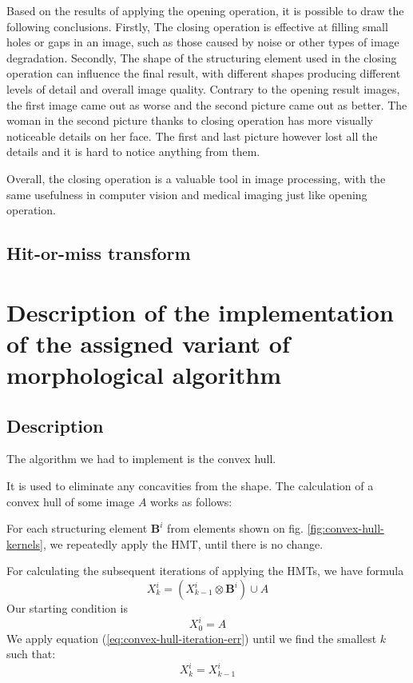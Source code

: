 \documentclass[12pt]{article}
\begin{document}
Based on the results of applying the opening operation, it is possible to draw the following conclusions. Firstly, The closing operation is effective at filling small holes or gaps in an image, such as those caused by noise or other types of image degradation. Secondly, The shape of the structuring element used in the closing operation can influence the final result, with different shapes producing different levels of detail and overall image quality. Contrary to the opening result images, the first image came out as worse and the second picture came out as better. The woman in the second picture thanks to closing operation has more visually noticeable details  on her face. The first and last picture however lost all the details and it is hard to notice anything from them.

Overall, the closing operation is a valuable tool in image processing, with the same usefulness in computer vision and medical imaging just like opening operation.
\subsection{Hit-or-miss transform}

\section{Description of the implementation of the assigned variant of morphological algorithm}

\subsection{Description}
The algorithm we had to implement is the convex hull.

It is used to eliminate any concavities from the shape.
The calculation of a convex hull of some image $A$ works as follows:

For each structuring element $\mathbf{B}^i$ from elements shown on fig. \ref{fig:convex-hull-kernels},
we repeatedly apply the HMT, until there is no change.

For calculating the subsequent iterations of applying the HMTs, we have formula
\begin{equation}
    X^i_k = (X^i_{k-1} \otimes \mathbf{B}^i) \cup A
    \label{eq:convex-hull-iteration-err}
\end{equation}
Our starting condition is
\begin{equation}
    X^i_0 = A
    \label{eq:convex-hull-start-condition}
\end{equation}
We apply equation (\ref*{eq:convex-hull-iteration-err}) until we find the smallest $k$ such that:
\begin{equation}
    X^i_k = X^i_{k-1}
    \label{eq:convex-hull-final-condition}
\end{equation}
\end{document}
